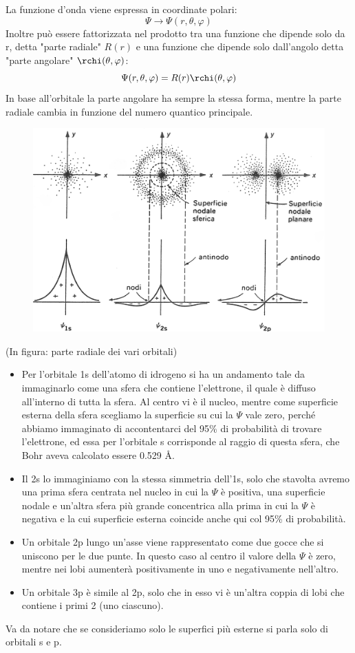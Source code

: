 La funzione d'onda viene espressa in coordinate polari:
$$\Psi \rightarrow \Psi(r, \theta, \varphi)$$
Inoltre può essere fattorizzata nel prodotto tra una funzione che dipende solo da r, detta "parte radiale" $R(r)$ e una funzione che dipende solo dall'angolo detta "parte angolare" $\rchi(\theta, \varphi)$:
$$\Psi(r, \theta, \varphi)=R(r) \rchi(\theta, \varphi)$$
In base all'orbitale la parte angolare ha sempre la stessa forma, mentre la parte radiale cambia in funzione del numero quantico principale.
\begin{figure}[htp]
  \centering
  \includegraphics[width=15cm]{immagini/psi.png}
\end{figure}

(In figura: parte radiale dei vari orbitali)

\begin{itemize}
  \item Per l'orbitale 1s dell'atomo di idrogeno si ha un andamento tale da immaginarlo come una sfera che contiene l'elettrone, il quale è diffuso all'interno di tutta la sfera. Al centro vi è il nucleo, mentre come superficie esterna della sfera scegliamo la superficie su cui la $\Psi$ vale zero, perché abbiamo immaginato di accontentarci del 95\% di probabilità di trovare l'elettrone, ed essa per l'orbitale s corrisponde al raggio di questa sfera, che Bohr aveva calcolato essere 0.529 Å.
  \item Il 2s lo immaginiamo con la stessa simmetria dell'1s, solo che stavolta avremo una prima sfera centrata nel nucleo in cui la $\Psi$ è positiva, una superficie nodale e un'altra sfera più grande concentrica alla prima in cui la $\Psi$ è negativa e la cui superficie esterna coincide anche qui col 95\% di probabilità.
  \item Un orbitale 2p lungo un'asse viene rappresentato come due gocce che si uniscono per le due punte. In questo caso al centro il valore della $\Psi$ è zero, mentre nei lobi aumenterà positivamente in uno e negativamente nell'altro.
  \item Un orbitale 3p è simile al 2p, solo che in esso vi è un'altra coppia di lobi che contiene i primi 2 (uno ciascuno).
\end{itemize}
 Va da notare che se consideriamo solo le superfici più esterne si parla solo di orbitali s e p.

